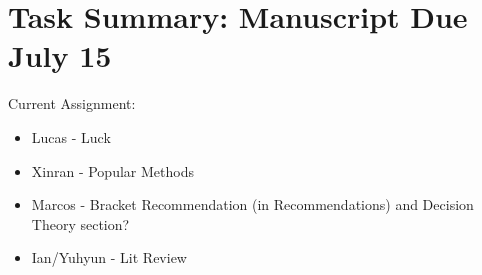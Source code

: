 \section*{Task Summary: Manuscript Due July 15}

Current Assignment:
\begin{itemize}
\item Lucas - Luck
\item Xinran - Popular Methods
\item Marcos - Bracket Recommendation (in Recommendations) and Decision Theory section?
\item Ian/Yuhyun - Lit Review
\end{itemize}
